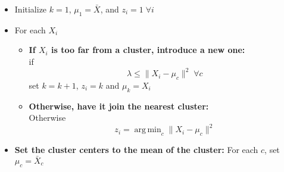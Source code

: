 \documentclass[11pt]{article}
\theoremstyle{definition}
\DeclareMathOperator*{\argmin}{arg\,min}
\begin{document}
\begin{itemize}
    \item Initialize $k=1$, $\mu_1 = \bar X$, and $z_i=1 \;\forall i$
    \item For each $X_i$
        \begin{itemize}
            \item {\bf If $X_i$ is too far from a cluster, introduce a new one:} \\
                if 
                \[\lambda \leq \|X_i-\mu_c\|^2 \; \forall c\]
                set $k=k+1$, $z_i=k$ and $\mu_k=X_i$
            \item {\bf Otherwise, have it join the nearest cluster:} \\
                Otherwise 
                \[z_i=\argmin_c\|X_i-\mu_c\|^2\]
        \end{itemize}
    \item {\bf Set the cluster centers to the mean of the cluster:} For each $c$, set $\mu_c = \bar X_c$
\end{itemize}
\end{document}
